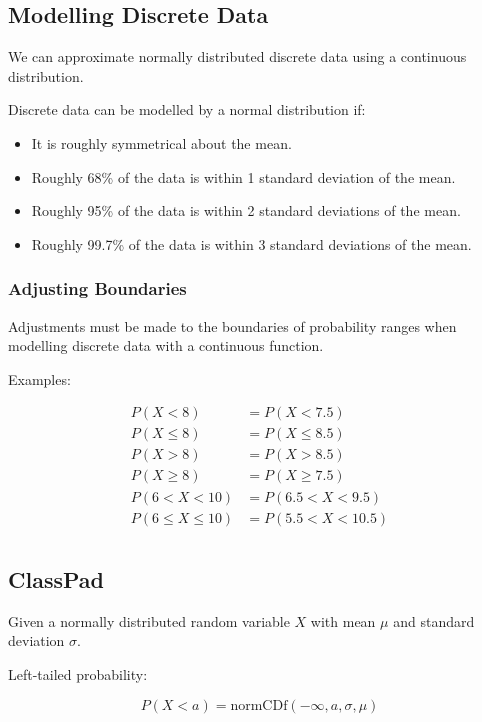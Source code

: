 \documentclass[a4paper,11pt]{article}
\begin{document}
\subsection{Modelling Discrete Data}

We can approximate normally distributed discrete data using a continuous
distribution.

Discrete data can be modelled by a normal distribution if:

\begin{itemize}
\item It is roughly symmetrical about the mean.
\item Roughly 68\% of the data is within 1 standard deviation of the mean.
\item Roughly 95\% of the data is within 2 standard deviations of the mean.
\item Roughly 99.7\% of the data is within 3 standard deviations of the mean.
\end{itemize}


\subsubsection{Adjusting Boundaries}

Adjustments must be made to the boundaries of probability ranges when modelling
discrete data with a continuous function.

Examples:

$$
\begin{aligned}
P(X < 8) & = P(X < 7.5) \\
P(X \leq 8) & = P(X \leq 8.5) \\
P(X > 8) & = P(X > 8.5) \\
P(X \geq 8) & = P(X \geq 7.5) \\
P(6 < X < 10) & = P(6.5 < X < 9.5) \\
P(6 \leq X \leq 10) & = P(5.5 < X < 10.5) \\
\end{aligned}
$$


\subsection{ClassPad}

Given a normally distributed random variable $X$ with mean $\mu$ and standard
deviation $\sigma$.

Left-tailed probability:

$$
P(X < a) = \text{normCDf}(-\infty, a, \sigma, \mu)
$$
\end{document}

